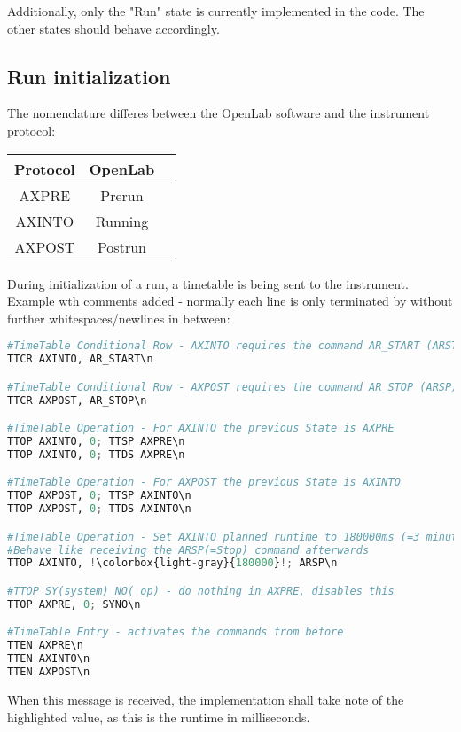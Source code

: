 \documentclass[]{scrartcl}
\begin{document}
	Additionally, only the "Run" state is currently implemented in the code. The other states should behave accordingly.
	\subsection{Run initialization}

	The nomenclature differes between the OpenLab software and the instrument protocol:
\begin{center}
	\begin{tabular}{ |c|c|c| }
\hline
	\textbf{Protocol} & \textbf{OpenLab} \\
\hline\hline
	AXPRE & Prerun \\\hline
	AXINTO & Running \\\hline
	AXPOST & Postrun\\\hline
	\end{tabular}	
\end{center}

	During initialization of a run, a timetable is being sent to the instrument.
	Example wth comments added - normally each line is only terminated by  without further whitespaces/newlines in between:
\label{init}
\begin{lstlisting}[language=Python,escapechar=!,caption=Timetable initialisation,showspaces=true]
#TimeTable Conditional Row - AXINTO requires the command AR_START (ARST)
TTCR AXINTO, AR_START\n

#TimeTable Conditional Row - AXPOST requires the command AR_STOP (ARSP)
TTCR AXPOST, AR_STOP\n

#TimeTable Operation - For AXINTO the previous State is AXPRE
TTOP AXINTO, 0; TTSP AXPRE\n
TTOP AXINTO, 0; TTDS AXPRE\n

#TimeTable Operation - For AXPOST the previous State is AXINTO
TTOP AXPOST, 0; TTSP AXINTO\n
TTOP AXPOST, 0; TTDS AXINTO\n

#TimeTable Operation - Set AXINTO planned runtime to 180000ms (=3 minutes)
#Behave like receiving the ARSP(=Stop) command afterwards
TTOP AXINTO, !\colorbox{light-gray}{180000}!; ARSP\n

#TTOP SY(system) NO( op) - do nothing in AXPRE, disables this
TTOP AXPRE, 0; SYNO\n

#TimeTable Entry - activates the commands from before
TTEN AXPRE\n
TTEN AXINTO\n
TTEN AXPOST\n
\end{lstlisting}
When this message is received, the implementation shall take note of the highlighted value, as this is the runtime in milliseconds.
	
\end{document}
